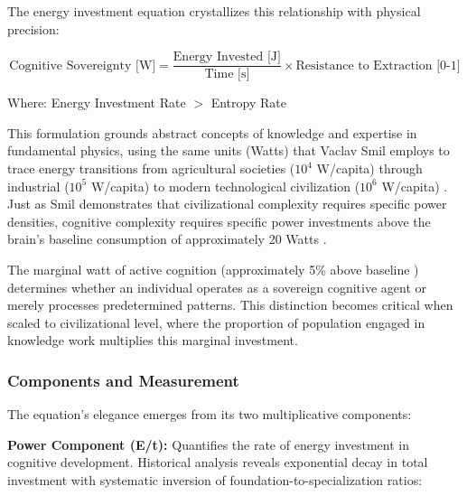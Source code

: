 The energy investment equation crystallizes this relationship with physical precision:

\begin{equation}
\text{Cognitive Sovereignty [W]} = \frac{\text{Energy Invested [J]}}{\text{Time [s]}} \times \text{Resistance to Extraction [0-1]}
\end{equation}

Where: Energy Investment Rate $>$ Entropy Rate

This formulation grounds abstract concepts of knowledge and expertise in fundamental physics, using the same units (Watts) that Vaclav Smil employs to trace energy transitions from agricultural societies ($10^4$ W/capita) through industrial ($10^5$ W/capita) to modern technological civilization ($10^6$ W/capita) \citep{smil2017}. Just as Smil demonstrates that civilizational complexity requires specific power densities, cognitive complexity requires specific power investments above the brain's baseline consumption of approximately 20 Watts \citep{raichle2002}.

The marginal watt of active cognition (approximately 5\% above baseline \citep{jamadar2025}) determines whether an individual operates as a sovereign cognitive agent or merely processes predetermined patterns. This distinction becomes critical when scaled to civilizational level, where the proportion of population engaged in knowledge work multiplies this marginal investment.

\subsubsection{Components and Measurement}

The equation's elegance emerges from its two multiplicative components:

\textbf{Power Component (E/t):} Quantifies the rate of energy investment in cognitive development. Historical analysis reveals exponential decay in total investment with systematic inversion of foundation-to-specialization ratios:

